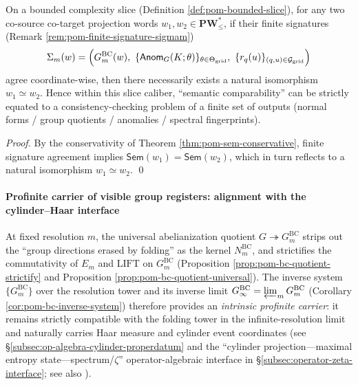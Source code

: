 \begin{corollary}\label{cor:pom-finite-audit-nf-anom}
On a bounded complexity slice (Definition \ref{def:pom-bounded-slice}),
for any two co-source co-target projection words \(w_1,w_2\in\mathbf{PW}^{\ast}_{\le}\), if their finite signatures (Remark \ref{rem:pom-finite-signature-sigmam})
\[
\Sigma_m(w)
=
\Bigl(
G^{\mathrm{BC}}_m(w),\
\{\mathsf{Anom}_{G}(K;\theta)\}_{\theta\in\Theta_{\mathrm{grid}}},\
\{r_q(u)\}_{(q,u)\in\mathcal{G}_{\mathrm{grid}}}
\Bigr)
\]
agree coordinate-wise, then there necessarily exists a natural isomorphism \(w_1\simeq w_2\).
Hence within this slice caliber, ``semantic comparability'' can be strictly equated to a consistency-checking problem of a finite set of outputs (normal forms / group quotients / anomalies / spectral fingerprints).
\end{corollary}
\begin{proof}
By the conservativity of Theorem \ref{thm:pom-sem-conservative}, finite signature agreement implies \(\mathsf{Sem}(w_1)=\mathsf{Sem}(w_2)\), which in turn reflects to a natural isomorphism \(w_1\simeq w_2\). \qed
\end{proof}

\paragraph{Profinite carrier of visible group registers: alignment with the cylinder--Haar interface}
At fixed resolution \(m\), the universal abelianization quotient \(G\twoheadrightarrow G_m^{\mathrm{BC}}\) strips out the ``group directions erased by folding'' as the kernel \(N_m^{\mathrm{BC}}\), and strictifies the commutativity of \(E_m\) and \(\mathrm{LIFT}\) on \(G_m^{\mathrm{BC}}\) (Proposition \ref{prop:pom-bc-quotient-strictify} and Proposition \ref{prop:pom-bc-quotient-universal}).
The inverse system \(\{G_m^{\mathrm{BC}}\}\) over the resolution tower and its inverse limit
\(
G_\infty^{\mathrm{BC}}=\varprojlim_m G_m^{\mathrm{BC}}
\)
(Corollary \ref{cor:pom-bc-inverse-system}) therefore provides an \emph{intrinsic profinite carrier}: it remains strictly compatible with the folding tower in the infinite-resolution limit and naturally carries Haar measure and cylinder event coordinates (see \S\ref{subsec:op-algebra-cylinder-properdatum} and the ``cylinder projection---maximal entropy state---spectrum/\(\zeta\)'' operator-algebraic interface in \S\ref{subsec:operator-zeta-interface}; see also \cite{CuntzKrieger1980}).

